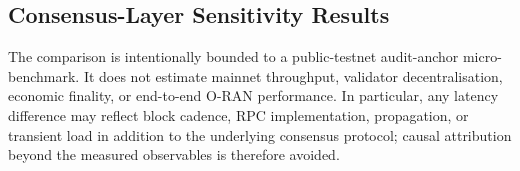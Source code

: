 \subsection{Consensus-Layer Sensitivity Results}
\label{sec:pos-rolldpos-results}


The comparison is intentionally bounded to a public-testnet audit-anchor
micro-benchmark. It does not estimate mainnet throughput, validator
decentralisation, economic finality, or end-to-end O-RAN performance. In particular,
any latency difference may reflect block cadence, RPC implementation, propagation,
or transient load in addition to the underlying consensus protocol; causal
attribution beyond the measured observables is therefore avoided.
